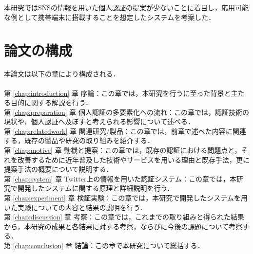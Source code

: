 本研究ではSNSの情報を用いた個人認証の提案が少ないことに着目し，応用可能な例として携帯端末に搭載することを想定したシステムを考案した．

\newpage

\section{論文の構成}
本論文は以下の章により構成される．\\
\\
第 \ref{chap:introduction} 章 序論：この章では，本研究を行うに至った背景と主たる目的に関する解説を行う．\\
第 \ref{chap:preparation} 章 個人認証の多要素化への流れ：この章では，認証技術の現状や，個人認証へ及ぼすと考えられる影響について述べる．\\
第 \ref{chap:relatedwork} 章 関連研究/製品：この章では，前章で述べた内容に関連する，既存の製品や研究の取り組みを紹介する．\\
第 \ref{chap:motive} 章 動機と提案：この章では，既存の認証における問題点と，それを改善するために近年普及した技術やサービスを用いる理由と既存手法，更に提案手法の概要について説明する．\\
第 \ref{chap:system} 章 Twitter上の情報を用いた認証システム：この章では，本研究で開発したシステムに関する原理と詳細説明を行う．\\
第 \ref{chap:experiment} 章 検証実験：この章では，本研究で開発したシステムを用いた実験についての内容と結果の説明を行う．\\
第 \ref{chap:discussion} 章 考察：この章では，これまでの取り組みと得られた結果から，本研究の成果と各結果に対する考察，ならびに今後の課題について考察する．\\
第 \ref{chap:conclusion} 章 結論：この章で本研究について総括する．\\

\newpage


